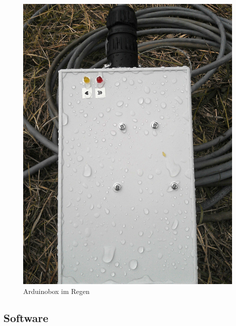 \documentclass[12pt,a4paper]{scrartcl}
\begin{document}
\begin{figure}[htb]
\begin{minipage}[H]{8cm}
	\includegraphics[scale=.111]{hardwareimages/arduinoboxregen.jpg}
	\caption{Arduinobox im Regen}
	\label{arduinoboxregen}
\end{minipage}
\end{figure}


\subsection{Software} 






\clearpage
\newpage
\appendix


\end{document}
